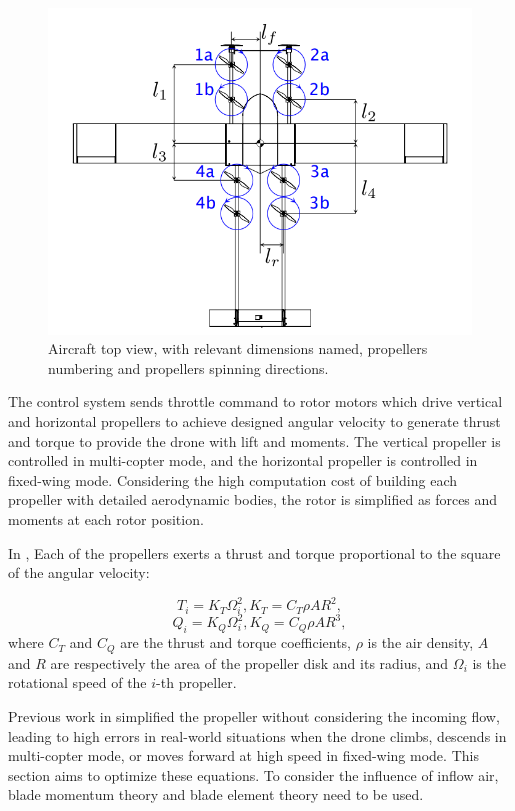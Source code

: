 \begin{figure}
    \centering
    \includegraphics[width=0.8\linewidth]{Images/Aircraft top view.png}
    \caption{Aircraft top view, with relevant dimensions named, propellers numbering and propellers spinning directions.}
    \label{fig:Aircraft top view}
\end{figure}

The control system sends throttle command to rotor motors which drive vertical and horizontal propellers to achieve designed angular velocity to generate thrust and torque to provide the drone with lift and moments. The vertical propeller is controlled in multi-copter mode, and the horizontal propeller is controlled in fixed-wing mode. Considering the high computation cost of building each propeller with detailed aerodynamic bodies, the rotor is simplified as forces and moments at each rotor position.

In \cite{battaini2022}, Each of the propellers exerts a thrust and torque proportional to the square of the angular velocity:

\begin{equation}
    T_i = K_T \Omega_i^2,  K_T = C_T \rho A R^2, \label{eq:thrust} 
\end{equation}
\begin{equation}
    Q_i = K_Q \Omega_i^2,  K_Q = C_Q \rho A R^3, \label{eq:torque}
\end{equation}
where $C_T$ and $C_Q$ are the thrust and torque coefficients, $\rho$ is the air density, $A$ and $R$ are respectively the area of the propeller disk and its radius, and $\Omega_i$ is the rotational speed of the $i$-th propeller.

Previous work in \cite{battaini2022} simplified the propeller without considering the incoming flow, leading to high errors in real-world situations when the drone climbs, descends in multi-copter mode, or moves forward at high speed in fixed-wing mode. This section aims to optimize these equations. To consider the influence of inflow air, blade momentum theory and blade element theory need to be used.

